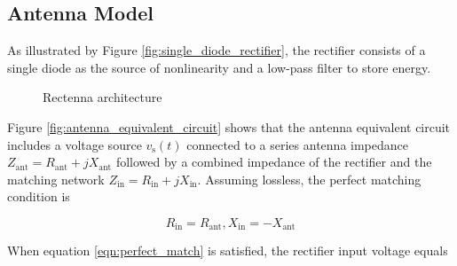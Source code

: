 \subsection{Antenna Model}\label{sec:antenna-model}

As illustrated by Figure \ref{fig:single_diode_rectifier}, the rectifier consists of a single diode as the source of nonlinearity and a low-pass filter to store energy.

%
%

\begin{figure}
  \centering
  \label{fig:antenna_equivalent_circuit}
  \label{fig:single_diode_rectifier}
  \caption{Rectenna architecture}
  \label{fig:rectenna_architecture}
\end{figure}

Figure \ref{fig:antenna_equivalent_circuit} shows that the antenna equivalent circuit includes a voltage source ${v_{\text{s}}}(t)$ connected to a series antenna impedance ${Z_{{\text{ant}}}} = {R_{{\text{ant}}}} + j{X_{{\text{ant}}}}$ followed by a combined impedance of the rectifier and the matching network ${Z_{{\text{in}}}} = {R_{{\text{in}}}} + j{X_{{\text{in}}}}$. Assuming lossless, the perfect matching condition is

\begin{equation}\label{eqn:perfect_match}
  {R_{{\text{in}}}} = {R_{{\text{ant}}}},{X_{{\text{in}}}} =  - {X_{{\text{ant}}}}
\end{equation}

When equation \ref{eqn:perfect_match} is satisfied, the rectifier input voltage equals

